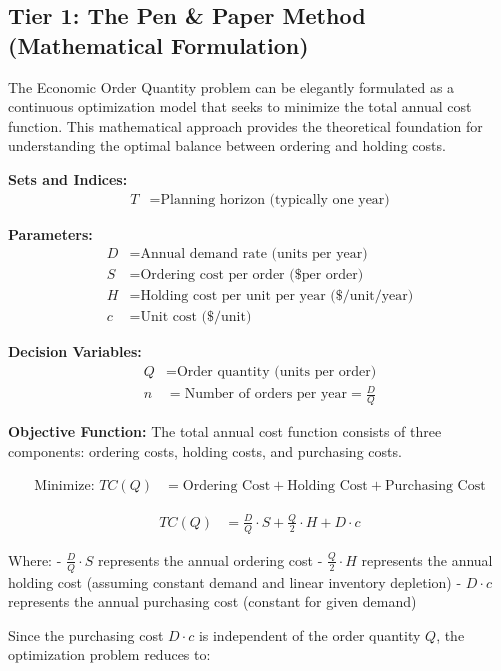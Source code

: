 \documentclass{article}
\begin{document}
\subsection{Tier 1: The Pen \& Paper Method (Mathematical Formulation)}

The Economic Order Quantity problem can be elegantly formulated as a continuous optimization model that seeks to minimize the total annual cost function. This mathematical approach provides the theoretical foundation for understanding the optimal balance between ordering and holding costs.

\textbf{Sets and Indices:}
\begin{align}
T &= \text{Planning horizon (typically one year)}
\end{align}

\textbf{Parameters:}
\begin{align}
D &= \text{Annual demand rate (units per year)} \\
S &= \text{Ordering cost per order (\$ per order)} \\
H &= \text{Holding cost per unit per year (\$/unit/year)} \\
c &= \text{Unit cost (\$/unit)}
\end{align}

\textbf{Decision Variables:}
\begin{align}
Q &= \text{Order quantity (units per order)} \\
n &= \text{Number of orders per year} = \frac{D}{Q}
\end{align}

\textbf{Objective Function:}
The total annual cost function consists of three components: ordering costs, holding costs, and purchasing costs.

\begin{align}
\text{Minimize: } TC(Q) &= \text{Ordering Cost} + \text{Holding Cost} + \text{Purchasing Cost}
\end{align}

\begin{align}
TC(Q) &= \frac{D}{Q} \cdot S + \frac{Q}{2} \cdot H + D \cdot c
\end{align}

Where:
- \(\frac{D}{Q} \cdot S\) represents the annual ordering cost
- \(\frac{Q}{2} \cdot H\) represents the annual holding cost (assuming constant demand and linear inventory depletion)
- \(D \cdot c\) represents the annual purchasing cost (constant for given demand)

Since the purchasing cost \(D \cdot c\) is independent of the order quantity \(Q\), the optimization problem reduces to:
\end{document}
